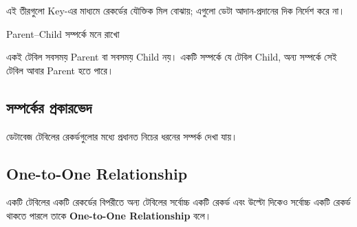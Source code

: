 এই তীরগুলো Key-এর মাধ্যমে রেকর্ডের যৌক্তিক মিল বোঝায়; এগুলো ডেটা আদান-প্রদানের দিক নির্দেশ করে না।


\begin{keypointbox}{Parent--Child সম্পর্কে মনে রাখো}

একই টেবিল সবসময় Parent বা সবসময় Child নয়। একটি সম্পর্কে যে টেবিল Child, অন্য সম্পর্কে
সেই টেবিল আবার Parent হতে পারে।

\end{keypointbox}



\subsection{সম্পর্কের প্রকারভেদ}

ডেটাবেজ টেবিলের রেকর্ডগুলোর মধ্যে প্রধানত নিচের ধরনের
সম্পর্ক দেখা যায়।

\begin{flushleft}

\end{flushleft}






\subsection{One-to-One Relationship}

\begin{definitionbox}{}

একটি টেবিলের একটি রেকর্ডের বিপরীতে অন্য টেবিলের সর্বোচ্চ
একটি রেকর্ড এবং উল্টো দিকেও সর্বোচ্চ একটি রেকর্ড থাকতে পারলে
তাকে \textbf{One-to-One Relationship} বলে।

\end{definitionbox}



